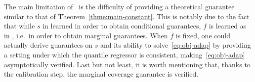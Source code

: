 The main limitation of \methodAD~is the difficulty of providing a theoretical guarantee similar to that of Theorem~\ref{thme:main-constant}. This is notably due to the fact that while $s$ in learned in order to obtain conditional guarantees, $f$ is learned as in \method, i.e.~in order to obtain marginal guarantees. When $f$ is fixed, one could actually derive guarantees on $\hat{s}$ and its ability to solve~\eqref{eq:obj-adap} by providing a setting under which the quantile regressor is consistent, making~\eqref{eq:obj-adap} asymptotically verified. Last but not least, it is worth mentioning that, thanks to the calibration step, the marginal coverage guarantee is verified.%


